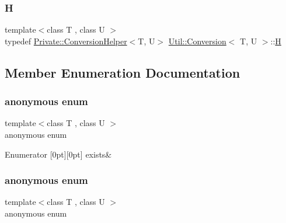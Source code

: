 \mbox{\label{structUtil_1_1Conversion_a2f11e8da88ca0599a47c7d9fcc3ff2f2}} 
\subsubsection{\texorpdfstring{H}{H}\hspace{0.1cm}{\footnotesize\ttfamily [3/3]}}
{\footnotesize\ttfamily template$<$class T , class U $>$ \\
typedef \mbox{\hyperlink{structUtil_1_1Private_1_1ConversionHelper}{Private\+::\+Conversion\+Helper}}$<$T, U$>$ \mbox{\hyperlink{structUtil_1_1Conversion}{Util\+::\+Conversion}}$<$ T, U $>$\+::\mbox{\hyperlink{structUtil_1_1Conversion_a2f11e8da88ca0599a47c7d9fcc3ff2f2}{H}}}



\subsection{Member Enumeration Documentation}
\mbox{\label{structUtil_1_1Conversion_a0afeebd8eb1397aae8486da9e36def56}} 
\subsubsection{\texorpdfstring{anonymous enum}{anonymous enum}}
{\footnotesize\ttfamily template$<$class T , class U $>$ \\
anonymous enum}

\begin{DoxyEnumFields}{Enumerator}
[0pt][0pt]{}\mbox{\label{structUtil_1_1Conversion_a85e1e7e32a81ebadbb1f987994283ab7a66cec7f52af17b9d2055795f332f3435}} 
exists&\\
\hline

\end{DoxyEnumFields}
\mbox{\label{structUtil_1_1Conversion_a95643f0bc1319702bcb44f0653b2cb07}} 
\subsubsection{\texorpdfstring{anonymous enum}{anonymous enum}}
{\footnotesize\ttfamily template$<$class T , class U $>$ \\
anonymous enum}

